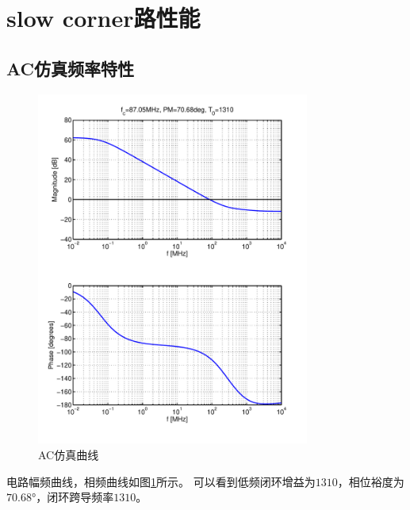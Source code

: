 \documentclass[a4paper]{article}
\newcommand{\udeg}{\si{\degree}}
\begin{document}

\clearpage
\newpage

\section{slow corner路性能}
\subsection{AC仿真频率特性}
\begin{figure}[htb]
    \begin{center}
        \includegraphics[width=0.8\textwidth]{slow/ac.pdf}
    \end{center}
    \caption{AC仿真曲线}
    \label{slowac}
\end{figure}
电路幅频曲线，相频曲线如图\ref{slowac}所示。
可以看到低频闭环增益为$1310$，相位裕度为$70.68\udeg$，闭环跨导频率$1310$。
\newpage
\clearpage
\end{document}
